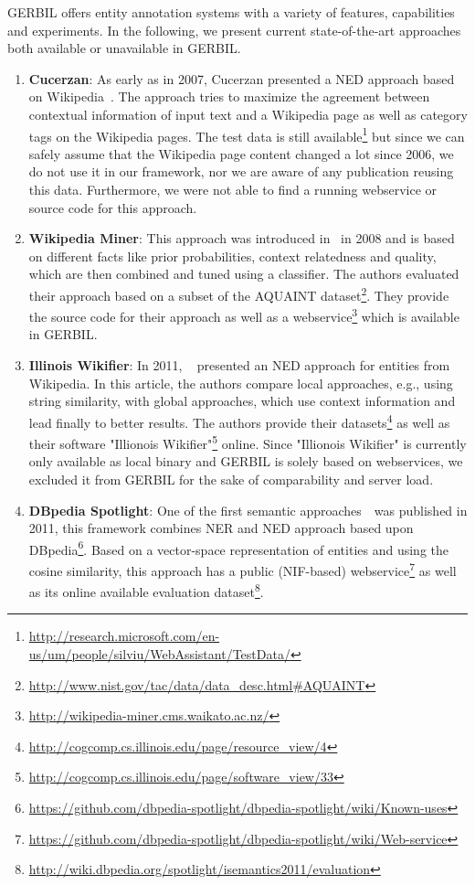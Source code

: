 GERBIL offers \overallGERBILannotators entity annotation systems with a variety of features, capabilities and experiments.
In the following, we present current state-of-the-art approaches both available or unavailable in GERBIL.

\begin{enumerate}
\item \textbf{Cucerzan}: As early as in 2007, Cucerzan presented a \ac{NED} approach based on Wikipedia~\cite{Cucerzan07}. The approach tries to maximize the agreement between contextual information of input text and a Wikipedia page as well as category tags on the Wikipedia pages.
The test data is still available\footnote{\url{http://research.microsoft.com/en-us/um/people/silviu/WebAssistant/TestData/}} but since we can safely assume that the Wikipedia page content changed a lot since 2006, we do not use it in our framework, nor we are aware of any publication reusing this data.
Furthermore, we were not able to find a running webservice or source code for this approach.

\item \textbf{Wikipedia Miner}: This approach was introduced in~\cite{milne2008learning} in 2008 and is based on different facts like prior probabilities, context relatedness and quality, which are then combined and tuned using a classifier.
The authors evaluated their approach based on a subset of the AQUAINT dataset\footnote{\url{http://www.nist.gov/tac/data/data_desc.html\#AQUAINT}}.
They provide the source code for their approach as well as a webservice\footnote{\url{http://wikipedia-miner.cms.waikato.ac.nz/}} which is available in GERBIL.

\item \textbf{Illinois Wikifier}: In 2011, ~\cite{rat:rot} presented an \ac{NED} approach for entities from Wikipedia. 
In this article, the authors compare local approaches, e.g., using string similarity, with global approaches, which use context information and lead finally to better results.
The authors provide their datasets\footnote{\url{http://cogcomp.cs.illinois.edu/page/resource_view/4}} as well as their software "Illionois Wikifier"\footnote{\url{http://cogcomp.cs.illinois.edu/page/software_view/33}} online.
Since "Illionois Wikifier" is currently only available as local binary and GERBIL is solely based on webservices, we excluded it from GERBIL for the sake of comparability and server load.

\item \textbf{DBpedia Spotlight}: One of the first semantic approaches~\cite{spotlight}\ was published in 2011, this framework combines \ac{NER} and \ac{NED} approach based upon DBpedia\footnote{\url{https://github.com/dbpedia-spotlight/dbpedia-spotlight/wiki/Known-uses}}. 
Based on a vector-space representation of entities and using the cosine similarity, this approach has a public (NIF-based) webservice\footnote{\url{https://github.com/dbpedia-spotlight/dbpedia-spotlight/wiki/Web-service}} as well as its online available evaluation dataset\footnote{\url{http://wiki.dbpedia.org/spotlight/isemantics2011/evaluation}}.


\end{enumerate}
